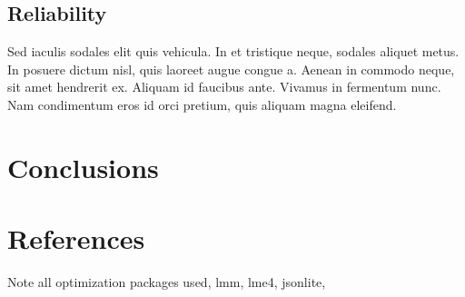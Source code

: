 \documentclass[article]{jss}
\begin{document}
\subsection[Reliablility]{Reliability}

 Sed iaculis sodales elit quis vehicula. In et tristique neque, sodales aliquet metus. In posuere dictum nisl, quis laoreet augue congue a. Aenean in commodo neque, sit amet hendrerit ex. Aliquam id faucibus ante. Vivamus in fermentum nunc. Nam condimentum eros id orci pretium, quis aliquam magna eleifend. 

\section[Conclusions]{Conclusions}

\section[References]{References}

Note all optimization packages used, lmm, lme4, jsonlite, 
\end{document}
